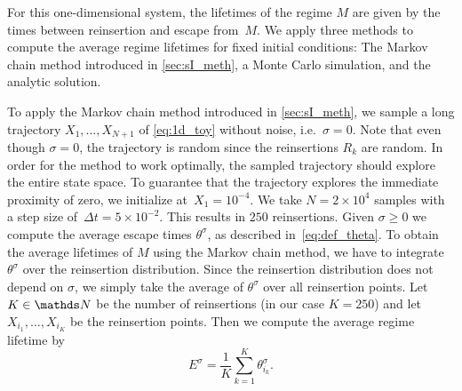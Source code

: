 For this one-dimensional system, the lifetimes of the regime $M$ are given by the times between reinsertion and escape from~$M$. We apply three methods to compute the average regime lifetimes for fixed initial conditions: The Markov chain method introduced in \cref{sec:sI_meth}, a Monte Carlo simulation, and the analytic solution.

To apply the Markov chain method introduced in \cref{sec:sI_meth}, we sample a long trajectory $X_1, \hdots, X_{N+1}$ of \cref{eq:1d_toy} without noise, i.e.~$\sigma=0$. Note that even though $\sigma=0$, the trajectory is random since the reinsertions $R_k$ are random. In order for the method to work optimally, the sampled trajectory should explore the entire state space. To guarantee that the trajectory explores the immediate proximity of zero, we initialize at~$X_1 = 10^{-4}$. We take $N=2\times 10^4$ samples with a step size of~$\Delta t = 5\times 10^{-2}$. This results in $250$ reinsertions.
Given $\sigma \geq 0$ we compute the average escape times $\theta^\sigma$, as described in~\cref{eq:def_theta}. To obtain the average lifetimes of $M$ using the Markov chain method, we have to integrate $\theta^\sigma$ over the reinsertion distribution. Since the reinsertion distribution does not depend on $\sigma$, we simply take the average of $\theta^\sigma$ over all reinsertion points. Let $K\in \N$ be the number of reinsertions (in our case $K=250$) and let $X_{i_1}, \hdots, X_{i_K}$ be the reinsertion points. Then we compute the average regime lifetime by
\begin{equation}
    E^\sigma = \frac{1}{K} \sum_{k=1}^K \theta^\sigma_{i_k}.
\end{equation}

